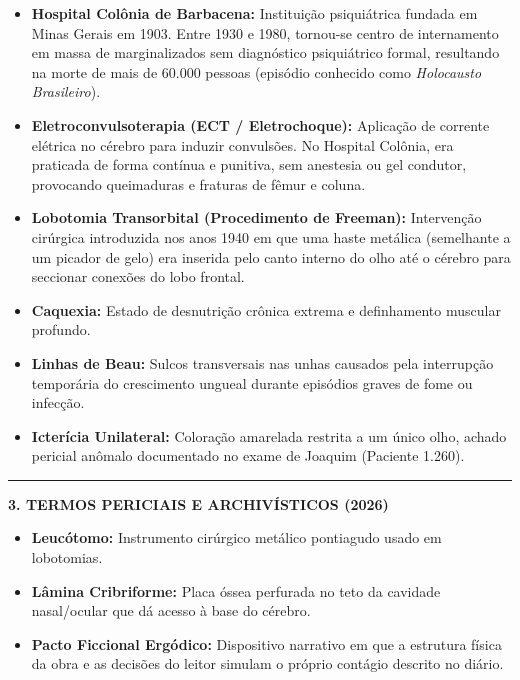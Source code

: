 \vspace{0.4em}
\begin{itemize}[itemsep=0.2em]
  \item \textbf{Hospital Colônia de Barbacena:} Instituição psiquiátrica fundada em Minas Gerais em 1903. Entre 1930 e 1980, tornou-se centro de internamento em massa de marginalizados sem diagnóstico psiquiátrico formal, resultando na morte de mais de 60.000 pessoas (episódio conhecido como \textit{Holocausto Brasileiro}).
  \item \textbf{Eletroconvulsoterapia (ECT / Eletrochoque):} Aplicação de corrente elétrica no cérebro para induzir convulsões. No Hospital Colônia, era praticada de forma contínua e punitiva, sem anestesia ou gel condutor, provocando queimaduras e fraturas de fêmur e coluna.
  \item \textbf{Lobotomia Transorbital (Procedimento de Freeman):} Intervenção cirúrgica introduzida nos anos 1940 em que uma haste metálica (semelhante a um picador de gelo) era inserida pelo canto interno do olho até o cérebro para seccionar conexões do lobo frontal.
  \item \textbf{Caquexia:} Estado de desnutrição crônica extrema e definhamento muscular profundo.
  \item \textbf{Linhas de Beau:} Sulcos transversais nas unhas causados pela interrupção temporária do crescimento ungueal durante episódios graves de fome ou infecção.
  \item \textbf{Icterícia Unilateral:} Coloração amarelada restrita a um único olho, achado pericial anômalo documentado no exame de Joaquim (Paciente 1.260).
\end{itemize}

\vspace{0.8em}
\noindent\rule{\textwidth}{0.5pt}
\vspace{0.6em}

\noindent\textbf{3. TERMOS PERICIAIS E ARCHIVÍSTICOS (2026)}

\vspace{0.4em}
\begin{itemize}[itemsep=0.2em]
  \item \textbf{Leucótomo:} Instrumento cirúrgico metálico pontiagudo usado em lobotomias.
  \item \textbf{Lâmina Cribriforme:} Placa óssea perfurada no teto da cavidade nasal/ocular que dá acesso à base do cérebro.
  \item \textbf{Pacto Ficcional Ergódico:} Dispositivo narrativo em que a estrutura física da obra e as decisões do leitor simulam o próprio contágio descrito no diário.
\end{itemize}

\endgroup
\clearpage
